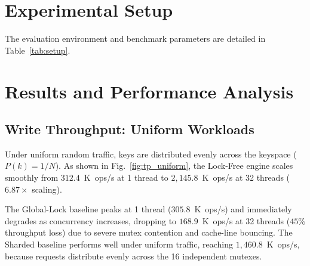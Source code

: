 \documentclass[conference]{IEEEtran}
\begin{document}
\section{Experimental Setup}
The evaluation environment and benchmark parameters are detailed in Table~\ref{tab:setup}.

\begin{table}[htbp]
\caption{Experimental & Benchmark Configuration}
\label{tab:setup}
\centering
{}
\end{table}

\section{Results and Performance Analysis}

\subsection{Write Throughput: Uniform Workloads}
Under uniform random traffic, keys are distributed evenly across the keyspace ($P(k) = 1/N$). As shown in Fig.~\ref{fig:tp_uniform}, the Lock-Free engine scales smoothly from $312.4$~K~ops/s at 1 thread to $2{,}145.8$~K~ops/s at 32 threads ($6.87\times$ scaling). 

The Global-Lock baseline peaks at 1 thread ($305.8$~K~ops/s) and immediately degrades as concurrency increases, dropping to $168.9$~K~ops/s at 32 threads ($45\%$ throughput loss) due to severe mutex contention and cache-line bouncing. The Sharded baseline performs well under uniform traffic, reaching $1{,}460.8$~K~ops/s, because requests distribute evenly across the 16 independent mutexes.
\end{document}
